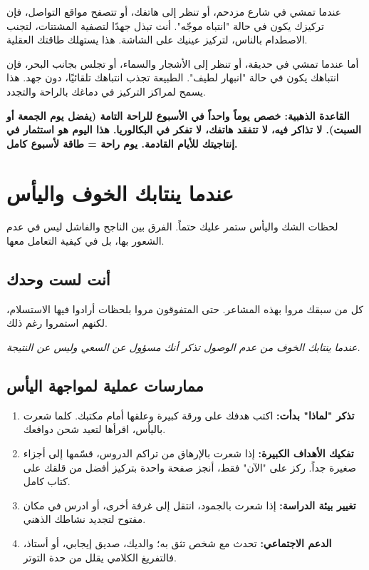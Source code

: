 \documentclass[12pt,a4paper]{book}
\newcommand{\quoteAr}[1]{%
	\begin{myquote}
		\itshape #1
	\end{myquote}
}
\newcommand{\importantAr}[1]{%
	\begin{important}
		\bfseries #1
	\end{important}
}
\begin{document}
	عندما تمشي في شارع مزدحم، أو تنظر إلى هاتفك، أو تتصفح مواقع التواصل، فإن تركيزك يكون في حالة "انتباه موجّه". أنت تبذل جهدًا لتصفية المشتتات، لتجنب الاصطدام بالناس، لتركيز عينيك على الشاشة. هذا يستهلك طاقتك العقلية.
	
	أما عندما تمشي في حديقة، أو تنظر إلى الأشجار والسماء، أو تجلس بجانب البحر، فإن انتباهك يكون في حالة "انبهار لطيف". الطبيعة تجذب انتباهك تلقائيًا، دون جهد. هذا يسمح لمراكز التركيز في دماغك بالراحة والتجدد.
		
	\importantAr{القاعدة الذهبية: خصص يوماً واحداً في الأسبوع للراحة التامة (يفضل يوم الجمعة أو السبت). لا تذاكر فيه، لا تتفقد هاتفك، لا تفكر في البكالوريا. هذا اليوم هو استثمار في إنتاجيتك للأيام القادمة. يوم راحة = طاقة لأسبوع كامل.}
	
	\section{عندما ينتابك الخوف واليأس}
	
	لحظات الشك واليأس ستمر عليك حتماً. الفرق بين الناجح والفاشل ليس في عدم الشعور بها، بل في كيفية التعامل معها.
	
	\subsection{أنت لست وحدك}
	كل من سبقك مروا بهذه المشاعر. حتى المتفوقون مروا بلحظات أرادوا فيها الاستسلام، لكنهم استمروا رغم ذلك.
	
	\quoteAr{عندما ينتابك الخوف من عدم الوصول تذكر أنك مسؤول عن السعي وليس عن النتيجة.}
	
	\subsection{ممارسات عملية لمواجهة اليأس}
	\begin{enumerate}
		\item \textbf{تذكر "لماذا" بدأت:} اكتب هدفك على ورقة كبيرة وعلقها أمام مكتبك. كلما شعرت باليأس، اقرأها لتعيد شحن دوافعك.
		\item \textbf{تفكيك الأهداف الكبيرة:} إذا شعرت بالإرهاق من تراكم الدروس، قسّمها إلى أجزاء صغيرة جداً. ركز على "الآن" فقط، أنجز صفحة واحدة بتركيز أفضل من قلقك على كتاب كامل.
		\item \textbf{تغيير بيئة الدراسة:} إذا شعرت بالجمود، انتقل إلى غرفة أخرى، أو ادرس في مكان مفتوح لتجديد نشاطك الذهني.
		\item \textbf{الدعم الاجتماعي:} تحدث مع شخص تثق به؛ والديك، صديق إيجابي، أو أستاذ، فالتفريغ الكلامي يقلل من حدة التوتر.
	\end{enumerate}
	
\end{document}
